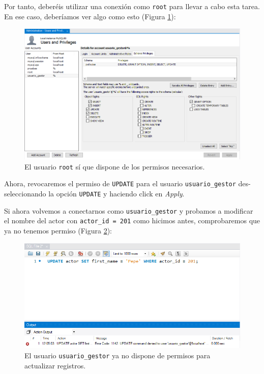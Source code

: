 \documentclass{db-practice}
\begin{document}
Por tanto, deberéis utilizar una conexión como \texttt{root} para llevar a cabo esta tarea. En ese caso, deberíamos ver algo como esto (Figura \ref{fig:gestor-root}):

\begin{figure}[H]
    \centering
    \includegraphics[width=1\linewidth]{figs/gestion-usuarios/gestor-usuarios-root.png}
    \caption{El usuario \texttt{root} sí que dispone de los permisos necesarios.}
    \label{fig:gestor-root}
\end{figure}

Ahora, revocaremos el permiso de \texttt{UPDATE} para el usuario \texttt{usuario\_gestor} des-seleccionando la opción \texttt{UPDATE} y haciendo click en \textit{Apply}.

Si ahora volvemos a conectarnos como \texttt{usuario\_gestor} y probamos a modificar el nombre del actor con \texttt{actor\_id = 201} como hicimos antes, comprobaremos que ya no tenemos permiso (Figura \ref{fig:usr_update_revocado}):

\begin{figure}[H]
    \centering
    \includegraphics[width=1\linewidth]{figs/gestion-usuarios/usr_update_revocado.png}
    \caption{El usuario \texttt{usuario\_gestor} ya no dispone de permisos para actualizar registros.}
    \label{fig:usr_update_revocado}
\end{figure}
\end{document}
